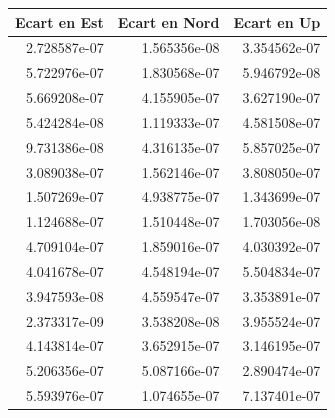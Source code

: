 \begin{tabular}{rrr}
\toprule
Ecart en Est & Ecart en Nord &  Ecart en Up \\
\midrule
2.728587e-07 &  1.565356e-08 & 3.354562e-07 \\
5.722976e-07 &  1.830568e-07 & 5.946792e-08 \\
5.669208e-07 &  4.155905e-07 & 3.627190e-07 \\
5.424284e-08 &  1.119333e-07 & 4.581508e-07 \\
9.731386e-08 &  4.316135e-07 & 5.857025e-07 \\
3.089038e-07 &  1.562146e-07 & 3.808050e-07 \\
1.507269e-07 &  4.938775e-07 & 1.343699e-07 \\
1.124688e-07 &  1.510448e-07 & 1.703056e-08 \\
4.709104e-07 &  1.859016e-07 & 4.030392e-07 \\
4.041678e-07 &  4.548194e-07 & 5.504834e-07 \\
3.947593e-08 &  4.559547e-07 & 3.353891e-07 \\
2.373317e-09 &  3.538208e-08 & 3.955524e-07 \\
4.143814e-07 &  3.652915e-07 & 3.146195e-07 \\
5.206356e-07 &  5.087166e-07 & 2.890474e-07 \\
5.593976e-07 &  1.074655e-07 & 7.137401e-07 \\
\bottomrule
\end{tabular}
